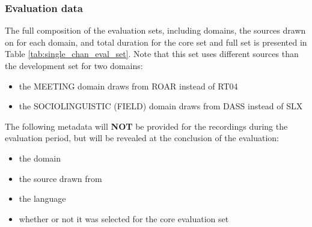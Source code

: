 \documentclass{article}
\begin{document}
\subsubsection{Evaluation data}
The full composition of the evaluation sets, including domains, the sources drawn on for each domain, and total duration for the core set and full set is presented in Table \ref{tab:single_chan_eval_set}. Note that this set uses different sources than the development set for two domains:
    \begin{itemize}
        \item the MEETING domain draws from ROAR instead of RT04
        \item the SOCIOLINGUISTIC (FIELD) domain draws from DASS instead of SLX
    \end{itemize}
The following metadata will {\bf NOT} be provided for the recordings during the evaluation period, but will be revealed at the conclusion of the evaluation:
% 
    \begin{itemize}
        \item the domain
        \item the source drawn from
        \item the language
        \item whether or not it was selected for the core evaluation set
    \end{itemize}
%
\end{document}
